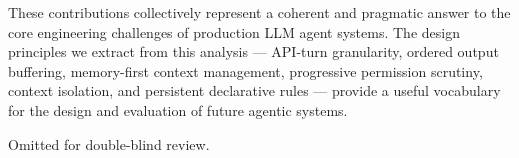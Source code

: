 \documentclass{article}
\begin{document}
These contributions collectively represent a coherent and pragmatic answer to the core engineering challenges of production LLM agent systems. The design principles we extract from this analysis --- API-turn granularity, ordered output buffering, memory-first context management, progressive permission scrutiny, context isolation, and persistent declarative rules --- provide a useful vocabulary for the design and evaluation of future agentic systems.

\begin{ack}
Omitted for double-blind review.
\end{ack}



\end{document}
